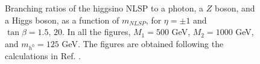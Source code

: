 \begin{figure}[htbp]
	\centering
{}
\caption{Branching ratios of the higgsino NLSP to a photon, a $Z$ boson, and a Higgs boson, as a function of $m_{NLSP}$, for $\eta=\pm1$ and $\tan\beta=1.5,\,20$. In all the figures, $M_1=500$ GeV, $M_2=1000$ GeV, and $m_{h^0}=125$ GeV. The figures are obtained following the calculations in Ref. \cite{Meade:2009qv}.}
\label{fig:higgsinoBR}
\end{figure}

